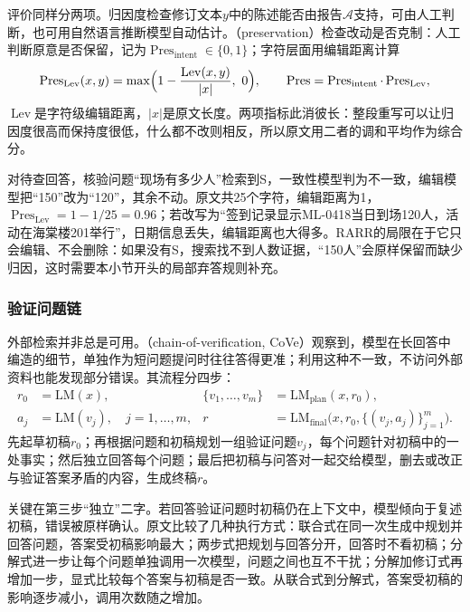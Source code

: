 评价同样分两项。归因度检查修订文本$y$中的陈述能否由报告$\mathcal{A}$支持，可由人工判断，也可用自然语言推断模型自动估计。（preservation）检查改动是否克制：人工判断原意是否保留，记为$\operatorname{Pres}_{\mathrm{intent}}\in\{0,1\}$；字符层面用编辑距离计算
\begin{equation}
 \operatorname{Pres}_{\mathrm{Lev}}(x,y)=\max\Bigl(1-\frac{\operatorname{Lev}(x,y)}{|x|},\ 0\Bigr),\qquad
 \operatorname{Pres}=\operatorname{Pres}_{\mathrm{intent}}\cdot\operatorname{Pres}_{\mathrm{Lev}},
 \label{eq:nlp-dialogue-rarr-preservation}
\end{equation}
$\operatorname{Lev}$是字符级编辑距离，$|x|$是原文长度。两项指标此消彼长：整段重写可以让归因度很高而保持度很低，什么都不改则相反，所以原文用二者的调和平均作为综合分。

对待查回答，核验问题“现场有多少人”检索到S，一致性模型判为不一致，编辑模型把“150”改为“120”，其余不动。原文共25个字符，编辑距离为1，$\operatorname{Pres}_{\mathrm{Lev}}=1-1/25=0.96$；若改写为“签到记录显示ML-0418当日到场120人，活动在海棠楼201举行”，日期信息丢失，编辑距离也大得多。RARR的局限在于它只会编辑、不会删除：如果没有S，搜索找不到人数证据，“150人”会原样保留而缺少归因，这时需要本小节开头的局部弃答规则补充。

\subsubsection{验证问题链}
\label{sec:nlp-dialogue-cove}

外部检索并非总是可用。（chain-of-verification, CoVe）观察到，模型在长回答中编造的细节，单独作为短问题提问时往往答得更准；利用这种不一致，不访问外部资料也能发现部分错误。其流程分四步：
\begin{equation}
 \begin{aligned}
 r_0&=\mathrm{LM}(x), &
 \{v_1,\ldots,v_m\}&=\mathrm{LM}_{\mathrm{plan}}(x,r_0),\\
 a_j&=\mathrm{LM}(v_j),\quad j=1,\ldots,m, &
 r&=\mathrm{LM}_{\mathrm{final}}\bigl(x,r_0,\{(v_j,a_j)\}_{j=1}^m\bigr).
 \end{aligned}
 \label{eq:nlp-dialogue-cove}
\end{equation}
先起草初稿$r_0$；再根据问题和初稿规划一组验证问题$v_j$，每个问题针对初稿中的一处事实；然后独立回答每个问题；最后把初稿与问答对一起交给模型，删去或改正与验证答案矛盾的内容，生成终稿$r$。

关键在第三步“独立”二字。若回答验证问题时初稿仍在上下文中，模型倾向于复述初稿，错误被原样确认。原文比较了几种执行方式：联合式在同一次生成中规划并回答问题，答案受初稿影响最大；两步式把规划与回答分开，回答时不看初稿；分解式进一步让每个问题单独调用一次模型，问题之间也互不干扰；分解加修订式再增加一步，显式比较每个答案与初稿是否一致。从联合式到分解式，答案受初稿的影响逐步减小，调用次数随之增加。

